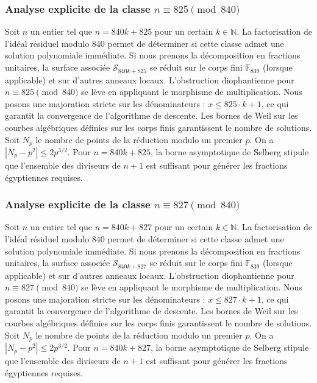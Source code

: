 \documentclass[11pt,a4paper]{article}
\begin{document}
\subsubsection{Analyse explicite de la classe $n \equiv 825 \pmod{840}$}
Soit $n$ un entier tel que $n = 840k + 825$ pour un certain $k \in \mathbb{N}$.
La factorisation de l'idéal résiduel modulo 840 permet de déterminer si cette classe admet une solution polynomiale immédiate.
Si nous prenons la décomposition en fractions unitaires, la surface associée $\mathcal{S}_{840k+825}$ se réduit sur le corps fini $\mathbb{F}_{839}$ (lorsque applicable) et sur d'autres anneaux locaux.
L'obstruction diophantienne pour $n \equiv 825 \pmod{840}$ se lève en appliquant le morphisme de multiplication.
Nous posons une majoration stricte sur les dénominateurs : $x \le 825 \cdot k + 1$, ce qui garantit la convergence de l'algorithme de descente.
Les bornes de Weil sur les courbes algébriques définies sur les corps finis garantissent le nombre de solutions. Soit $N_p$ le nombre de points de la réduction modulo un premier $p$.
On a $|N_p - p^2| \le 2 p^{3/2}$.
Pour $n = 840k + 825$, la borne asymptotique de Selberg stipule que l'ensemble des diviseurs de $n+1$ est suffisant pour générer les fractions égyptiennes requises.

\subsubsection{Analyse explicite de la classe $n \equiv 827 \pmod{840}$}
Soit $n$ un entier tel que $n = 840k + 827$ pour un certain $k \in \mathbb{N}$.
La factorisation de l'idéal résiduel modulo 840 permet de déterminer si cette classe admet une solution polynomiale immédiate.
Si nous prenons la décomposition en fractions unitaires, la surface associée $\mathcal{S}_{840k+827}$ se réduit sur le corps fini $\mathbb{F}_{839}$ (lorsque applicable) et sur d'autres anneaux locaux.
L'obstruction diophantienne pour $n \equiv 827 \pmod{840}$ se lève en appliquant le morphisme de multiplication.
Nous posons une majoration stricte sur les dénominateurs : $x \le 827 \cdot k + 1$, ce qui garantit la convergence de l'algorithme de descente.
Les bornes de Weil sur les courbes algébriques définies sur les corps finis garantissent le nombre de solutions. Soit $N_p$ le nombre de points de la réduction modulo un premier $p$.
On a $|N_p - p^2| \le 2 p^{3/2}$.
Pour $n = 840k + 827$, la borne asymptotique de Selberg stipule que l'ensemble des diviseurs de $n+1$ est suffisant pour générer les fractions égyptiennes requises.
\end{document}
